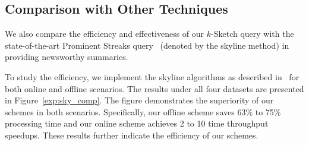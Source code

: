 \subsection{Comparison with Other Techniques}
\label{subsec:exp-survey}
We also compare the efficiency and effectiveness of our $k$-Sketch query with
the state-of-the-art Prominent Streaks query~\cite{zhang2014discovering} (denoted by the skyline method) in 
providing newsworthy summaries.

To study the efficiency, we implement the skyline algorithms as described in~\cite{zhang2014discovering} for
both online and offline scenarios. 
The results under all four datasets are presented in Figure~\ref{exp:sky_comp}. 
The figure demonstrates the superiority of our schemes in both scenarios.
Specifically, our offline scheme saves 63\% to 75\% processing time and our online scheme 
achieves 2 to 10 time throughput speedups. 
These results further indicate the efficiency of our schemes.



